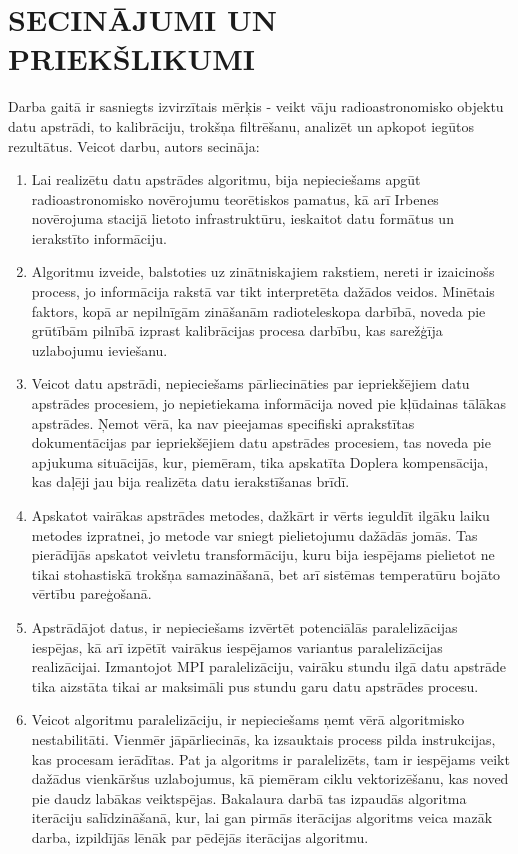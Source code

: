 \chapter*{SECINĀJUMI UN PRIEKŠLIKUMI}

Darba gaitā ir sasniegts izvirzītais mērķis - veikt vāju radioastronomisko objektu datu apstrādi, to kalibrāciju,  trokšņa filtrēšanu, analizēt un apkopot iegūtos rezultātus. Veicot darbu, autors secināja:

\begin{enumerate}

    \item Lai realizētu datu apstrādes algoritmu, bija nepieciešams apgūt radioastronomisko novērojumu teorētiskos pamatus, kā arī Irbenes novērojuma stacijā lietoto infrastruktūru, ieskaitot datu formātus un ierakstīto informāciju.
    \item Algoritmu izveide, balstoties uz zinātniskajiem rakstiem, nereti ir izaicinošs process, jo informācija  rakstā var tikt interpretēta dažādos veidos. Minētais faktors, kopā ar nepilnīgām zināšanām radioteleskopa darbībā, noveda pie grūtībām pilnībā izprast kalibrācijas procesa darbību, kas sarežģīja uzlabojumu ieviešanu.
    \item Veicot datu apstrādi, nepieciešams pārliecināties par iepriekšējiem datu apstrādes procesiem, jo nepietiekama informācija noved pie kļūdainas tālākas apstrādes. Ņemot vērā, ka nav pieejamas specifiski aprakstītas dokumentācijas par iepriekšējiem datu apstrādes procesiem, tas noveda pie apjukuma situācijās, kur, piemēram, tika apskatīta Doplera kompensācija, kas daļēji jau bija realizēta datu ierakstīšanas brīdī.
    \item Apskatot vairākas apstrādes metodes, dažkārt ir vērts ieguldīt ilgāku laiku metodes izpratnei, jo metode var sniegt pielietojumu dažādās jomās. Tas pierādījās apskatot veivletu transformāciju, kuru bija iespējams pielietot ne tikai stohastiskā trokšņa samazināšanā, bet arī sistēmas temperatūru bojāto vērtību pareģošanā.
    \item Apstrādājot datus, ir nepieciešams izvērtēt potenciālās paralelizācijas iespējas, kā arī izpētīt vairākus iespējamos variantus paralelizācijas realizācijai. Izmantojot MPI paralelizāciju, vairāku stundu ilgā datu apstrāde tika aizstāta tikai ar maksimāli pus stundu garu datu apstrādes procesu.
    \item Veicot algoritmu paralelizāciju, ir nepieciešams ņemt vērā algoritmisko nestabilitāti. Vienmēr jāpārliecinās, ka izsauktais process pilda instrukcijas, kas procesam ierādītas. Pat ja algoritms ir paralelizēts, tam ir iespējams veikt dažādus vienkāršus uzlabojumus, kā piemēram ciklu vektorizēšanu, kas noved pie daudz labākas veiktspējas. Bakalaura darbā tas izpaudās algoritma iterāciju salīdzināšanā, kur, lai gan pirmās iterācijas algoritms veica mazāk darba, izpildījās lēnāk par pēdējās iterācijas algoritmu. 

\end{enumerate}
